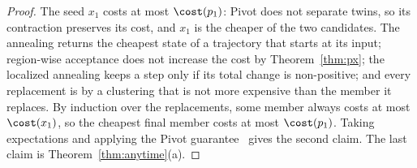 \begin{proof}
The seed $x_1$ costs at most $\cost(p_1)$: Pivot does not separate twins, so its
contraction preserves its cost, and $x_1$ is the cheaper of the two
candidates.  The annealing returns the cheapest state of a trajectory that
starts at its input; region-wise acceptance does not increase the cost by
Theorem~\ref{thm:px}; the localized annealing keeps a step only if its total
change is non-positive; and every replacement is by a clustering that is not
more expensive than the member it replaces.  By induction over the
replacements, some member always costs at most $\cost(x_1)$, so the cheapest
final member costs at most $\cost(p_1)$.  Taking expectations and applying the
Pivot guarantee~\citep{AilonCN08} gives the second claim.  The last claim is
Theorem~\ref{thm:anytime}(a).
\end{proof}
